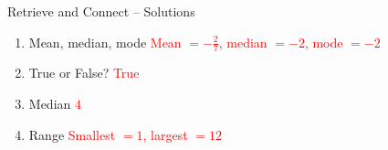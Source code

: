 \documentclass{beamer}
\begin{document}
\begin{frame}{Retrieve and Connect -- Solutions}
\vspace{-0.8em}

\footnotesize
\begin{enumerate}\itemsep2pt
  \item Mean, median, mode  
        \textcolor{red}{Mean $=-\frac{2}{7}$, median $=-2$, mode $=-2$}
  \item True or False?  
        \textcolor{red}{True}
  \item Median  
        \textcolor{red}{$4$}
  \item Range  
        \textcolor{red}{Smallest $=1$, largest $=12$}
\end{enumerate}
\end{frame}
\end{document}

